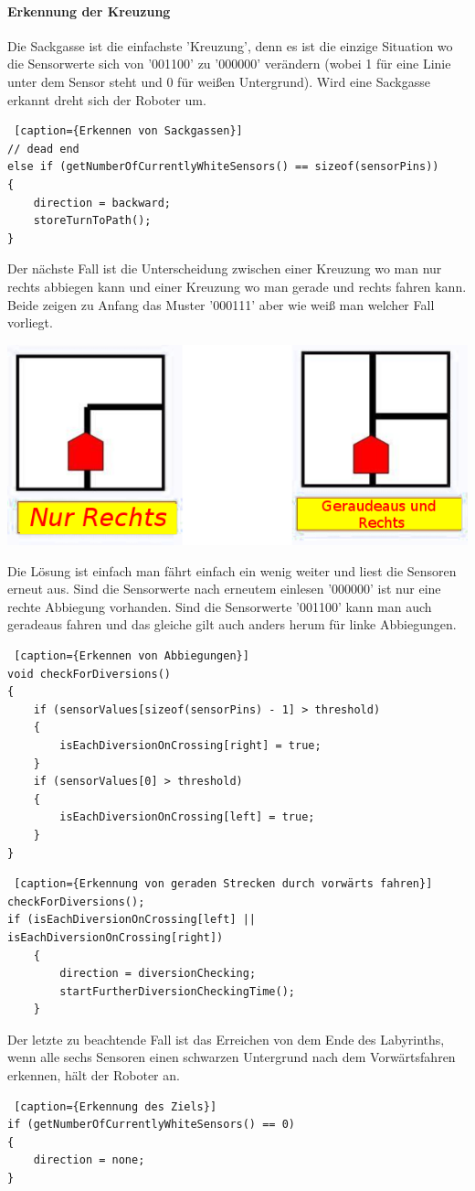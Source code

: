 \documentclass[12pt]{article}
\begin{document}
\paragraph{Erkennung der Kreuzung} Die Sackgasse ist die einfachste 'Kreuzung', denn es ist die einzige Situation wo die Sensorwerte sich von '001100' zu '000000' verändern (wobei 1 für eine Linie unter dem Sensor steht und 0 für weißen Untergrund). Wird eine Sackgasse erkannt dreht sich der Roboter um. 

\begin{lstlisting} [caption={Erkennen von Sackgassen}]
// dead end
else if (getNumberOfCurrentlyWhiteSensors() == sizeof(sensorPins))
{
    direction = backward;
    storeTurnToPath();
}
\end{lstlisting}
Der nächste Fall ist die Unterscheidung zwischen einer Kreuzung wo man nur rechts abbiegen kann und einer Kreuzung wo man gerade und rechts fahren kann. Beide zeigen zu Anfang das Muster '000111' aber wie weiß man welcher Fall vorliegt.

\includegraphics[width=1\textwidth]{images/case_right.png}

Die Lösung ist einfach man fährt einfach ein wenig weiter und liest die Sensoren erneut aus. Sind die Sensorwerte nach erneutem einlesen '000000' ist nur eine rechte Abbiegung vorhanden. Sind die Sensorwerte '001100' kann man auch geradeaus fahren und das gleiche gilt auch anders herum für linke Abbiegungen.

\begin{lstlisting} [caption={Erkennen von Abbiegungen}]
void checkForDiversions()
{
    if (sensorValues[sizeof(sensorPins) - 1] > threshold)
    {
        isEachDiversionOnCrossing[right] = true;
    }
    if (sensorValues[0] > threshold)
    {
        isEachDiversionOnCrossing[left] = true;
    }
}
\end{lstlisting}

\begin{lstlisting} [caption={Erkennung von geraden Strecken durch vorwärts fahren}]
checkForDiversions();
if (isEachDiversionOnCrossing[left] || isEachDiversionOnCrossing[right])
    {
        direction = diversionChecking;
        startFurtherDiversionCheckingTime();
    }
\end{lstlisting}
Der letzte zu beachtende Fall ist das Erreichen von dem  Ende des Labyrinths, wenn alle sechs Sensoren einen schwarzen Untergrund  nach dem Vorwärtsfahren erkennen, hält der Roboter an.
\begin{lstlisting} [caption={Erkennung des Ziels}]
if (getNumberOfCurrentlyWhiteSensors() == 0)
{
    direction = none;
}
\end{lstlisting}
\end{document}
